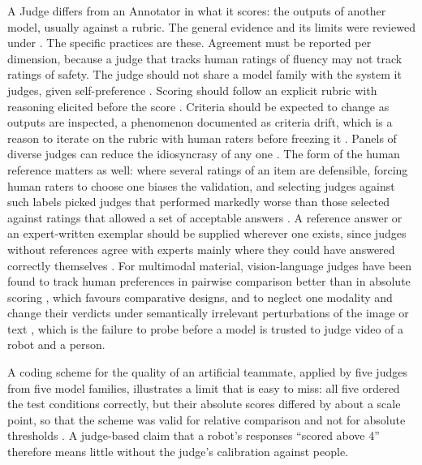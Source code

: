 A Judge differs from an Annotator in what it scores: the outputs of another
model, usually against a rubric. The general evidence and its limits were
reviewed under . The specific practices are these. Agreement
must be reported per dimension, because a judge that tracks human ratings of
fluency may not track ratings of safety. The judge should not share a model
family with the system it judges, given self-preference
\cite{panickssery2024llm}. Scoring should follow an explicit rubric with
reasoning elicited before the score \cite{liu2023geval}. Criteria should be
expected to change as outputs are inspected, a phenomenon documented as
criteria drift, which is a reason to iterate on the rubric with human raters
before freezing it \cite{shankar2024who}. Panels of diverse judges can reduce
the idiosyncrasy of any one \cite{verga2024replacing}. The form of the human
reference matters as well: where several ratings of an item are defensible,
forcing human raters to choose one biases the validation, and selecting
judges against such labels picked judges that performed markedly worse than
those selected against ratings that allowed a set of acceptable answers
\cite{guerdan2025validating}. A reference answer or an expert-written exemplar
should be supplied wherever one exists, since judges without references
agree with experts mainly where they could have answered correctly
themselves \cite{krumdick2026no}. For multimodal
material, vision-language judges have been found to track human preferences
in pairwise comparison better than in absolute scoring
\cite{chen2024mllmasajudge}, which favours comparative designs, and to neglect one
modality and change their verdicts under semantically irrelevant
perturbations of the image or text \cite{lee2026mmjudgebias}, which is the
failure to probe before a model is trusted to judge video of a robot and a
person.

A coding scheme for the quality of an artificial teammate, applied by
five judges from five model families, illustrates a limit that is easy to
miss: all five ordered the test conditions correctly, but their absolute
scores differed by about a scale point, so that the scheme was valid for
relative comparison and not for absolute thresholds
\cite{toxtli2026llm}. A judge-based claim that a robot's responses
``scored above 4'' therefore means little without the judge's calibration
against people.

